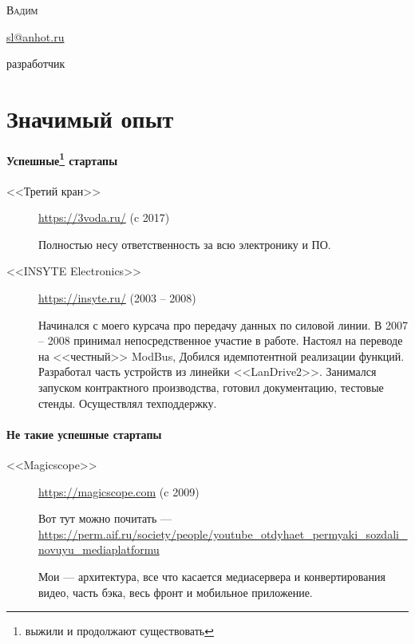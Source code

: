 \documentclass [a4paper,10pt]{article}
\begin{document}
\begin{center}
{\scshape\LARGE Вадим \par}
\href{mailto:sl@anhot.ru}{sl@anhot.ru}

разработчик
\end{center}
\section*{Значимый опыт}
\paragraph{Успешные\protect\footnote{выжили и продолжают существовать} стартапы}
\begin{description}
\item[<<Третий кран>>] \url{https://3voda.ru/} (c 2017) 

Полностью несу ответственность за всю электронику и ПО.

\item[<<INSYTE Electronics>>] \url{https://insyte.ru/} (2003 -- 2008)

Начинался с моего курсача про передачу данных по силовой линии. В 2007 -- 2008 принимал непосредственное участие в работе.
Настоял на переводе на <<честный>> ModBus, Добился идемпотентной реализации функций. Разработал часть устройств из линейки <<LanDrive2>>.
Занимался запуском контрактного производства, готовил документацию, тестовые стенды. Осуществлял техподдержку.
\end{description}

\paragraph{Не такие успешные стартапы}
\begin{description}
\item[<<Magicscope>>] \url{https://magicscope.com} (c 2009)

Вот тут можно почитать --- \url{https://perm.aif.ru/society/people/youtube_otdyhaet_permyaki_sozdali_novuyu_mediaplatformu}
	
Мои --- архитектура, все что касается медиасервера и конвертирования видео, часть бэка, весь фронт и мобильное приложение.
\end{description}
\end{document}
